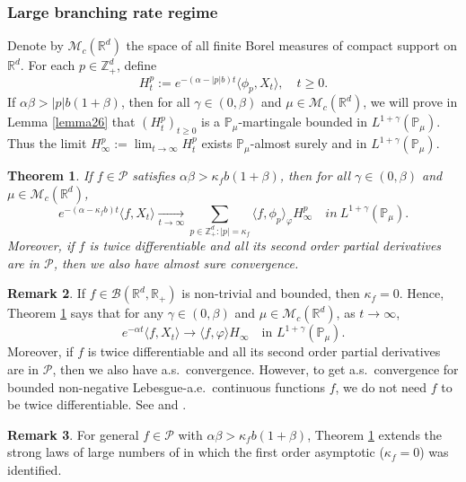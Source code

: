 \documentclass[12pt,a4paper]{amsart}
\theoremstyle{plain}
\newtheorem{thm}{Theorem}[section]
\theoremstyle{definition}
\newtheorem{rem}[thm]{Remark}
\numberwithin{equation}{section}
\begin{document}
\subsubsection{Large branching rate regime}
Denote by $\mathcal M_c(\mathbb R^d)$ the space of all finite Borel measures of compact support on $\mathbb R^d$.
For each $p\in \mathbb{Z}_+^d$, define
\[
  H_t^p
  := e^{-(\alpha-|p|b)t}\langle\phi_p,X_t\rangle,
  \quad t\geq 0.
\]
If $\alpha\beta>|p|b(1+\beta)$, then for all $\gamma\in (0, \beta)$ and $\mu\in \mathcal M_c(\mathbb R^d)$, we will prove in Lemma \ref{lemma26} that $(H_t^p)_{t\geq 0}$ is a $\mathbb{P}_{\mu}$-martingale bounded in $L^{1+\gamma}(\mathbb{P}_{\mu})$.
Thus the limit $H^p_{\infty}:=\lim_{t\rightarrow \infty}H_t^p$ exists $\mathbb{P}_{\mu}$-almost surely and in $L^{1+\gamma}(\mathbb{P}_{\mu})$.
\begin{thm}
  \label{thm: law of large number}
  If $f \in \mathcal{P}$ satisfies $\alpha\beta>\kappa_fb(1+\beta)$, then for all $\gamma\in (0, \beta)$ and  $\mu\in \mathcal M_c(\mathbb R^d)$,
  \[
    e^{-(\alpha-\kappa_fb)t}\langle f, X_t\rangle
    \xrightarrow[t\to \infty]{}\sum_{p\in \mathbb Z_+^d:|p|=\kappa_f}\langle f, \phi_p\rangle_{\varphi} H_{\infty}^p
    \quad in~ L^{1+\gamma}(\mathbb{P}_{\mu}).
  \]
  Moreover, if $f$ is twice differentiable and all its second order partial derivatives are in $\mathcal{P}$, then we also have almost sure convergence.
\end{thm}
\begin{rem}
  If $f\in \mathcal B(\mathbb R^d, \mathbb R_+)$ is non-trivial and  bounded, then $\kappa_f=0$.
  Hence, Theorem \ref{thm: law of large number} says that for any $\gamma\in (0, \beta)$ and  $\mu\in \mathcal M_c(\mathbb R^d)$, as $t\rightarrow \infty$,
  \[
    e^{-\alpha t}\langle f, X_t\rangle
    \rightarrow \langle f, \varphi\rangle H_{\infty}
    \quad \mbox{in } L^{1+\gamma}(\mathbb{P}_{\mu}).
  \]
  Moreover, if $f$ is twice differentiable and all its second order partial derivatives are in $\mathcal{P}$, then we also have a.\/s.\ convergence.
  However, to get  a.\/s.\ convergence for bounded non-negative 
  Lebesgue-a.\/e.\/\ continuous functions $f$, we do not need $f$ to be twice differentiable. See \cite[Theorem 2.13 \& Example 8.1]{ChenRenYang2019Skeleton} and \cite[Theorem 1.2 \& Example 4.1]{EckhoffKyprianouWinkel2015Spines}.
\end{rem}
\begin{rem}
  For general $f\in \mathcal{P}$ with $\alpha\beta>\kappa_fb(1+\beta)$, Theorem \ref{thm: law of large number} extends the strong laws of large numbers of \cite{ChenRenYang2019Skeleton, EckhoffKyprianouWinkel2015Spines} in which the first order asymptotic ($\kappa_f=0$) was identified.
\end{rem}
\end{document}

